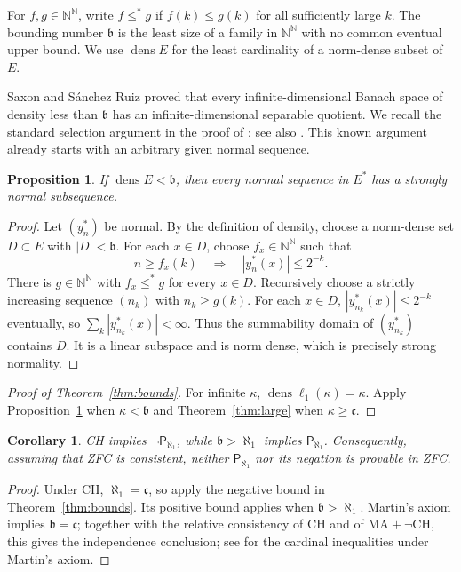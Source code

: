 \documentclass[10pt,a4paper]{amsart}
\newtheorem{proposition}[theorem]{Proposition}
\newtheorem{corollary}[theorem]{Corollary}
\newcommand{\N}{\mathbb N}
\newcommand{\cfrak}{\mathfrak c}
\DeclareMathOperator{\dens}{dens}
\begin{document}
For $f,g\in\N^{\N}$, write $f\leqslant^*g$ if $f(k)\leqslant g(k)$
for all sufficiently large $k$. The bounding number $\mathfrak b$ is
the least size of a family in $\N^{\N}$ with no common eventual upper
bound. We use $\dens E$ for the least cardinality of a norm-dense
subset of $E$.

Saxon and S\'anchez Ruiz \cite[Theorem~3]{SSR} proved that every
infinite-dimensional Banach space of density less than $\mathfrak b$
has an infinite-dimensional separable quotient. We recall the standard
selection argument in the proof of \cite[Corollary~11]{FKLS}; see also
\cite[proof of Theorem~2.1]{Brech}. This known argument already starts
with an arbitrary given normal sequence.

\begin{proposition}\label{prop:small}
If $\dens E<\mathfrak b$, then every normal sequence in $E^*$ has a
strongly normal subsequence.
\end{proposition}

\begin{proof}
Let $(y_n^*)$ be normal. By the definition of density, choose a
norm-dense set $D\subset E$ with $|D|<\mathfrak b$. For each $x\in D$,
choose $f_x\in\N^{\N}$ such that
\[
 n\geqslant f_x(k)\quad\Longrightarrow\quad
 |y_n^*(x)|\leqslant2^{-k}.
\]
There is $g\in\N^{\N}$ with $f_x\leqslant^*g$ for every $x\in D$.
Recursively choose a strictly increasing sequence $(n_k)$ with
$n_k\geqslant g(k)$. For each $x\in D$,
$|y_{n_k}^*(x)|\leqslant2^{-k}$ eventually, so
$\sum_k|y_{n_k}^*(x)|<\infty$. Thus the summability domain of
$(y_{n_k}^*)$ contains $D$. It is a linear subspace and is norm dense,
which is precisely strong normality.
\end{proof}


\begin{proof}[Proof of Theorem~\ref{thm:bounds}]
For infinite $\kappa$, $\dens\ell_1(\kappa)=\kappa$. Apply
Proposition~\ref{prop:small} when $\kappa<\mathfrak b$ and
Theorem~\ref{thm:large} when $\kappa\geqslant\cfrak$.
\end{proof}


\begin{corollary}\label{cor:independence}
CH implies $\neg\mathsf P_{\aleph_1}$, while
$\mathfrak b>\aleph_1$ implies $\mathsf P_{\aleph_1}$.
Consequently, assuming that ZFC is consistent, neither
$\mathsf P_{\aleph_1}$ nor its negation is provable in ZFC.
\end{corollary}

\begin{proof}
Under CH, $\aleph_1=\cfrak$, so apply the negative bound in
Theorem~\ref{thm:bounds}. Its positive bound applies when
$\mathfrak b>\aleph_1$. Martin's axiom implies
$\mathfrak b=\cfrak$; together with the relative consistency of CH
and of $\mathrm{MA}+\neg\mathrm{CH}$, this gives the independence
conclusion; see \cite[Section~6]{Blass} for the cardinal inequalities
under Martin's axiom.
\end{proof}
\end{document}
